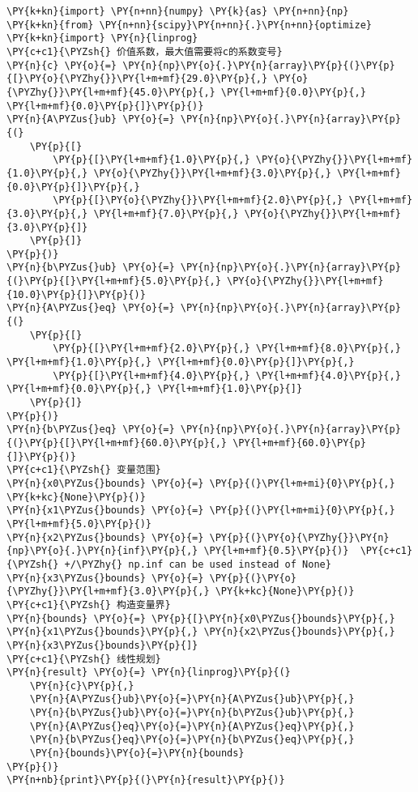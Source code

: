     \begin{tcolorbox}[breakable, size=fbox, boxrule=1pt, pad at break*=1mm,colback=cellbackground, colframe=cellborder]
\begin{Verbatim}[commandchars=\\\{\}]
\PY{k+kn}{import} \PY{n+nn}{numpy} \PY{k}{as} \PY{n+nn}{np}
\PY{k+kn}{from} \PY{n+nn}{scipy}\PY{n+nn}{.}\PY{n+nn}{optimize} \PY{k+kn}{import} \PY{n}{linprog}
\PY{c+c1}{\PYZsh{} 价值系数，最大值需要将c的系数变号}
\PY{n}{c} \PY{o}{=} \PY{n}{np}\PY{o}{.}\PY{n}{array}\PY{p}{(}\PY{p}{[}\PY{o}{\PYZhy{}}\PY{l+m+mf}{29.0}\PY{p}{,} \PY{o}{\PYZhy{}}\PY{l+m+mf}{45.0}\PY{p}{,} \PY{l+m+mf}{0.0}\PY{p}{,} \PY{l+m+mf}{0.0}\PY{p}{]}\PY{p}{)}
\PY{n}{A\PYZus{}ub} \PY{o}{=} \PY{n}{np}\PY{o}{.}\PY{n}{array}\PY{p}{(}
    \PY{p}{[}
        \PY{p}{[}\PY{l+m+mf}{1.0}\PY{p}{,} \PY{o}{\PYZhy{}}\PY{l+m+mf}{1.0}\PY{p}{,} \PY{o}{\PYZhy{}}\PY{l+m+mf}{3.0}\PY{p}{,} \PY{l+m+mf}{0.0}\PY{p}{]}\PY{p}{,}
        \PY{p}{[}\PY{o}{\PYZhy{}}\PY{l+m+mf}{2.0}\PY{p}{,} \PY{l+m+mf}{3.0}\PY{p}{,} \PY{l+m+mf}{7.0}\PY{p}{,} \PY{o}{\PYZhy{}}\PY{l+m+mf}{3.0}\PY{p}{]}
    \PY{p}{]}
\PY{p}{)}
\PY{n}{b\PYZus{}ub} \PY{o}{=} \PY{n}{np}\PY{o}{.}\PY{n}{array}\PY{p}{(}\PY{p}{[}\PY{l+m+mf}{5.0}\PY{p}{,} \PY{o}{\PYZhy{}}\PY{l+m+mf}{10.0}\PY{p}{]}\PY{p}{)}
\PY{n}{A\PYZus{}eq} \PY{o}{=} \PY{n}{np}\PY{o}{.}\PY{n}{array}\PY{p}{(}
    \PY{p}{[}
        \PY{p}{[}\PY{l+m+mf}{2.0}\PY{p}{,} \PY{l+m+mf}{8.0}\PY{p}{,} \PY{l+m+mf}{1.0}\PY{p}{,} \PY{l+m+mf}{0.0}\PY{p}{]}\PY{p}{,}
        \PY{p}{[}\PY{l+m+mf}{4.0}\PY{p}{,} \PY{l+m+mf}{4.0}\PY{p}{,} \PY{l+m+mf}{0.0}\PY{p}{,} \PY{l+m+mf}{1.0}\PY{p}{]}
    \PY{p}{]}
\PY{p}{)}
\PY{n}{b\PYZus{}eq} \PY{o}{=} \PY{n}{np}\PY{o}{.}\PY{n}{array}\PY{p}{(}\PY{p}{[}\PY{l+m+mf}{60.0}\PY{p}{,} \PY{l+m+mf}{60.0}\PY{p}{]}\PY{p}{)}
\PY{c+c1}{\PYZsh{} 变量范围}
\PY{n}{x0\PYZus{}bounds} \PY{o}{=} \PY{p}{(}\PY{l+m+mi}{0}\PY{p}{,} \PY{k+kc}{None}\PY{p}{)}
\PY{n}{x1\PYZus{}bounds} \PY{o}{=} \PY{p}{(}\PY{l+m+mi}{0}\PY{p}{,} \PY{l+m+mf}{5.0}\PY{p}{)}
\PY{n}{x2\PYZus{}bounds} \PY{o}{=} \PY{p}{(}\PY{o}{\PYZhy{}}\PY{n}{np}\PY{o}{.}\PY{n}{inf}\PY{p}{,} \PY{l+m+mf}{0.5}\PY{p}{)}  \PY{c+c1}{\PYZsh{} +/\PYZhy{} np.inf can be used instead of None}
\PY{n}{x3\PYZus{}bounds} \PY{o}{=} \PY{p}{(}\PY{o}{\PYZhy{}}\PY{l+m+mf}{3.0}\PY{p}{,} \PY{k+kc}{None}\PY{p}{)}
\PY{c+c1}{\PYZsh{} 构造变量界}
\PY{n}{bounds} \PY{o}{=} \PY{p}{[}\PY{n}{x0\PYZus{}bounds}\PY{p}{,} \PY{n}{x1\PYZus{}bounds}\PY{p}{,} \PY{n}{x2\PYZus{}bounds}\PY{p}{,} \PY{n}{x3\PYZus{}bounds}\PY{p}{]}
\PY{c+c1}{\PYZsh{} 线性规划}
\PY{n}{result} \PY{o}{=} \PY{n}{linprog}\PY{p}{(}
    \PY{n}{c}\PY{p}{,} 
    \PY{n}{A\PYZus{}ub}\PY{o}{=}\PY{n}{A\PYZus{}ub}\PY{p}{,} 
    \PY{n}{b\PYZus{}ub}\PY{o}{=}\PY{n}{b\PYZus{}ub}\PY{p}{,} 
    \PY{n}{A\PYZus{}eq}\PY{o}{=}\PY{n}{A\PYZus{}eq}\PY{p}{,} 
    \PY{n}{b\PYZus{}eq}\PY{o}{=}\PY{n}{b\PYZus{}eq}\PY{p}{,} 
    \PY{n}{bounds}\PY{o}{=}\PY{n}{bounds}
\PY{p}{)}
\PY{n+nb}{print}\PY{p}{(}\PY{n}{result}\PY{p}{)}
\end{Verbatim}
\end{tcolorbox}

